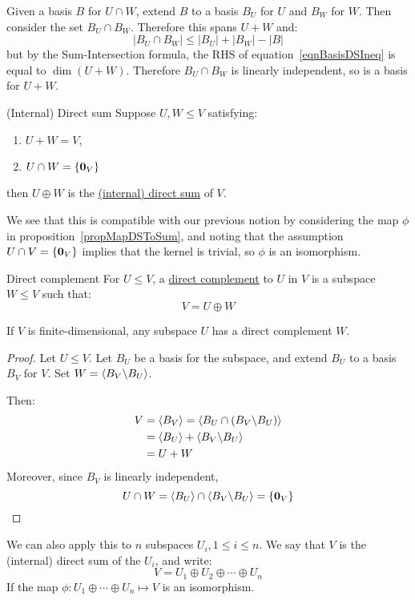 \documentclass[../Main.tex]{subfiles}
\begin{document}
Given a basis $B$ for $U \cap W$, extend $B$ to a basis $B_U$ for $U$ and $B_W$ for $W$. Then consider the set $B_U \cap B_W$. Therefore this spans $U + W$ and:
\begin{equation}
    |B_U \cap B_W| \leq |B_U| + |B_W| - |B|
    \label{eqnBasisDSIneq}
\end{equation}
but by the Sum-Intersection formula, the RHS of equation~\ref{eqnBasisDSIneq} is equal to $\dim(U + W)$. Therefore $B_U \cap B_W$ is linearly independent, so is a basis for $U + W$.
\begin{definition}{(Internal) Direct sum}
    Suppose $U, W \leq V$ satisfying:
    \begin{enumerate}
        \item $U + W = V$,
        \item $U \cap W = \{\boldsymbol{0}_V\}$
    \end{enumerate} 
    then $U \oplus W$ is the \underline{(internal) direct sum} of $V$.
\end{definition}
We see that this is compatible with our previous notion by considering the map $\phi$ in proposition~\ref{propMapDSToSum}, and noting that the assumption $U \cap V = \{\boldsymbol{0}_V\}$ implies that the kernel is trivial, so $\phi$ is an isomorphism.
\begin{definition}{Direct complement}
    For $U \leq V$, a \underline{direct complement} to $U$ in $V$ is a subspace $W \leq V$ such that:
    \begin{equation*}
        V = U \oplus W
    \end{equation*}
\end{definition}
\begin{proposition}
    If $V$ is finite-dimensional, any subspace $U$ has a direct complement $W$.
    \label{propDCExists}
\end{proposition}
\begin{proof}
    Let $U \leq V$. Let $B_U$ be a basis for the subspace, and extend $B_U$ to a basis $B_V$ for $V$. Set $W = \langle B_V \backslash B_U \rangle$.

    Then:
    \begin{align*}
        V &= \langle B_V \rangle = \langle B_U \cap (B_V \backslash B_U) \rangle \\
        &= \langle B_U \rangle + \langle B_V \backslash B_U \rangle \\
        &= U + W
    \end{align*}
    Moreover, since $B_V$ is linearly independent,
    \begin{equation*}
        U \cap W = \langle B_U \rangle \cap \langle B_V \backslash B_U \rangle = \{\boldsymbol{0}_V\}
    \end{equation*}
\end{proof}
We can also apply this to $n$ subspaces $U_i, 1 \leq i \leq n$. We say that $V$ is the (internal) direct sum of the $U_i$, and write:
\begin{equation*}
    V = U_1 \oplus U_2 \oplus \cdots \oplus U_n
\end{equation*}
If the map $\phi : U_1 \oplus \cdots \oplus U_n \mapsto V$ is an isomorphism.
\end{document}
